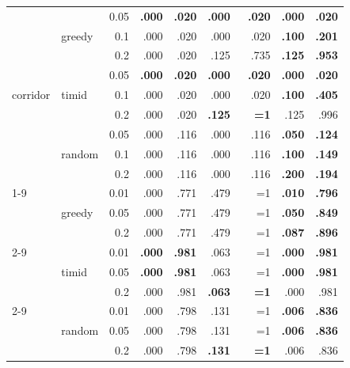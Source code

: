 \documentclass{article}
\begin{document}
\begin{table}[h]
\begin{tabular}{l@{\hskip 12pt} l@{\hskip 12pt} r@{\hskip 12pt} rr@{\hskip 12pt} rr@{\hskip 12pt} rr@{\hskip 12pt}}
\multirow{9}{*}{corridor} & \multirow{3}{*}{greedy} & 0.05 & \textbf{.000} & \textbf{.020} & \textbf{.000} & \textbf{.020} & \textbf{.000} & \textbf{.020} \\
 &  & 0.1 & .000 & .020 & .000 & .020 & \textbf{.100} & \textbf{.201} \\
 &  & 0.2 & .000 & .020 & .125 & .735 & \textbf{.125} & \textbf{.953} \\
 \cmidrule(lr){2-9}
 & \multirow{3}{*}{timid} & 0.05 & \textbf{.000} & \textbf{.020} & \textbf{.000} & \textbf{.020} & \textbf{.000} & \textbf{.020} \\
 &  & 0.1 & .000 & .020 & .000 & .020 & \textbf{.100} & \textbf{.405} \\
 &  & 0.2 & .000 & .020 & \textbf{.125} & \textbf{~~{=}1} & .125 & .996 \\
 \cmidrule(lr){2-9}
 & \multirow{3}{*}{random} & 0.05 & .000 & .116 & .000 & .116 & \textbf{.050} & \textbf{.124} \\
 &  & 0.1 & .000 & .116 & .000 & .116 & \textbf{.100} & \textbf{.149} \\
 &  & 0.2 & .000 & .116 & .000 & .116 & \textbf{.200} & \textbf{.194} \\
 \cmidrule(lr){1-9}
\multirow{9}{*}{dpm} & \multirow{3}{*}{greedy} & 0.01 & .000 & .771 & \cellcolor{red!20}.479 & \cellcolor{red!20}~~{=}1 & \textbf{.010} & \textbf{.796} \\
 &  & 0.05 & .000 & .771 & \cellcolor{red!20}.479 & \cellcolor{red!20}~~{=}1 & \textbf{.050} & \textbf{.849} \\
 &  & 0.2 & .000 & .771 & \cellcolor{red!20}.479 & \cellcolor{red!20}~~{=}1 & \textbf{.087} & \textbf{.896} \\
 \cmidrule(lr){2-9}
 & \multirow{3}{*}{timid} & 0.01 & \textbf{.000} & \textbf{.981} & \cellcolor{red!20}.063 & \cellcolor{red!20}~~{=}1 & \textbf{.000} & \textbf{.981} \\
 &  & 0.05 & \textbf{.000} & \textbf{.981} & \cellcolor{red!20}.063 & \cellcolor{red!20}~~{=}1 & \textbf{.000} & \textbf{.981} \\
 &  & 0.2 & .000 & .981 & \textbf{.063} & \textbf{~~{=}1} & .000 & .981 \\
 \cmidrule(lr){2-9}
 & \multirow{3}{*}{random} & 0.01 & .000 & .798 & \cellcolor{red!20}.131 & \cellcolor{red!20}~~{=}1 & \textbf{.006} & \textbf{.836} \\
 &  & 0.05 & .000 & .798 & \cellcolor{red!20}.131 & \cellcolor{red!20}~~{=}1 & \textbf{.006} & \textbf{.836} \\
 &  & 0.2 & .000 & .798 & \textbf{.131} & \textbf{~~{=}1} & .006 & .836 \\

\end{tabular}
\end{table}
\end{document}
